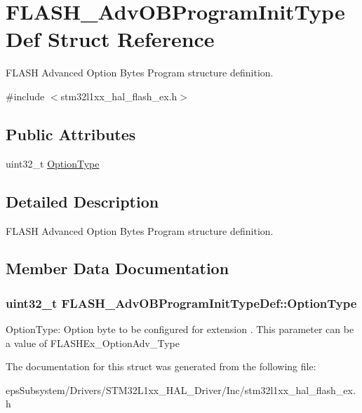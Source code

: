 \hypertarget{struct_f_l_a_s_h___adv_o_b_program_init_type_def}{\section{F\-L\-A\-S\-H\-\_\-\-Adv\-O\-B\-Program\-Init\-Type\-Def Struct Reference}
\label{struct_f_l_a_s_h___adv_o_b_program_init_type_def}
}


F\-L\-A\-S\-H Advanced Option Bytes Program structure definition.  




{\ttfamily \#include $<$stm32l1xx\-\_\-hal\-\_\-flash\-\_\-ex.\-h$>$}

\subsection*{Public Attributes}
\begin{DoxyCompactItemize}
\item 
uint32\-\_\-t \hyperlink{struct_f_l_a_s_h___adv_o_b_program_init_type_def_addc57691b6721cfa8b62092e72e9b775}{Option\-Type}
\end{DoxyCompactItemize}


\subsection{Detailed Description}
F\-L\-A\-S\-H Advanced Option Bytes Program structure definition. 

\subsection{Member Data Documentation}
\hypertarget{struct_f_l_a_s_h___adv_o_b_program_init_type_def_addc57691b6721cfa8b62092e72e9b775}{
\subsubsection[{Option\-Type}]{\setlength{\rightskip}{0pt plus 5cm}uint32\-\_\-t F\-L\-A\-S\-H\-\_\-\-Adv\-O\-B\-Program\-Init\-Type\-Def\-::\-Option\-Type}}\label{struct_f_l_a_s_h___adv_o_b_program_init_type_def_addc57691b6721cfa8b62092e72e9b775}
Option\-Type\-: Option byte to be configured for extension . This parameter can be a value of F\-L\-A\-S\-H\-Ex\-\_\-\-Option\-Adv\-\_\-\-Type 

The documentation for this struct was generated from the following file\-:\begin{DoxyCompactItemize}
\item 
eps\-Subsystem/\-Drivers/\-S\-T\-M32\-L1xx\-\_\-\-H\-A\-L\-\_\-\-Driver/\-Inc/stm32l1xx\-\_\-hal\-\_\-flash\-\_\-ex.\-h\end{DoxyCompactItemize}
